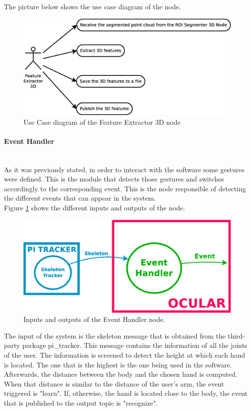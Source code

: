	The picture below shows the use case diagram of the node. 

	\begin{figure}[H]
		\centering
			\includegraphics[scale=0.4]{img/diagrams/uc_feature_extractor_3d.eps}
			\caption[Use case diagram Feature Extractor 3D node]{Use Case diagram of the Feature Extractor 3D node}
		
	\end{figure}

\newpage

\paragraph{Event Handler}\mbox{}\\

	As it was previously stated, in order to interact with the software some gestures were defined. This is the module that detects those gestures and switches accordingly to the corresponding event. This is the node responsible of detecting the different events that can appear in the system. 
	\\
	Figure \ref{node_event} shows the different inputs and outputs of the node. 
		\begin{figure}[H]
			\begin{center}
			\includegraphics[width=0.5\linewidth]{img/diagrams/node_event.eps}
			\caption[Event Handler 3D node I/O]{Inputs and outputs of the Event Handler node.}		
			\label{node_event}
			\end{center}
		\end{figure}
	The input of the system is the skeleton message that is obtained from the third-party package pi\_tracker. This message contains the information of all the joints of the user. The information is screened to detect the height at which each hand is located. The one that is the highest is the one being used in the software. Afterwards, the distance between the body and the chosen hand is computed. When that distance is similar to the distance of the user's arm, the event triggered is "learn". If, otherwise, the hand is located close to the body, the event that is published to the output topic is "recognize". 
	\\

